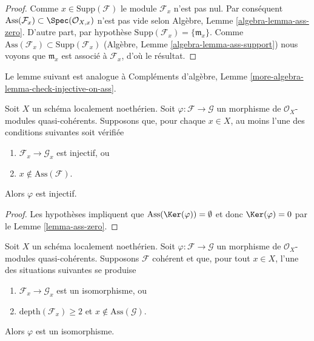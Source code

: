 \begin{proof}
Comme  $x \in \text{Supp}(\mathcal{F})$  le module  $\mathcal{F}_x$  n’est pas nul. Par conséquent
 $\text{Ass}(\mathcal{F}_x) \subset \Spec(\mathcal{O}_{X, x})$  n’est pas vide selon Algèbre, Lemme  \ref{algebra-lemma-ass-zero}. D’autre part, par
hypothèse  $\text{Supp}(\mathcal{F}_x) = \{\mathfrak m_x\}$. Comme  $\text{Ass}(\mathcal{F}_x) \subset \text{Supp}(\mathcal{F}_x)$  (Algèbre, Lemme  \ref{algebra-lemma-ass-support}) nous
voyons que  $\mathfrak m_x$  est associé à  $\mathcal{F}_x$, d'où le résultat.
\end{proof}

\noindent
Le lemme suivant est analogue à Compléments d'algèbre, Lemme  \ref{more-algebra-lemma-check-injective-on-ass}.

\begin{lemma}
\label{lemma-check-injective-on-ass}
Soit $X$ un schéma localement noethérien. Soit
$\varphi : \mathcal{F} \to \mathcal{G}$ un morphisme de
$\mathcal{O}_X$-modules quasi-cohérents. Supposons que, pour
chaque $x \in X$, au moins l'une des conditions suivantes soit vérifiée
\begin{enumerate}
\item $\mathcal{F}_x \to \mathcal{G}_x$  est injectif, ou
\item $x \not \in \text{Ass}(\mathcal{F})$.
\end{enumerate}
Alors  $\varphi$  est injectif.
\end{lemma}

\begin{proof}
Les hypothèses impliquent que  $\text{Ass}(\Ker(\varphi)) = \emptyset$  et donc  $\Ker(\varphi) = 0$  par le Lemme
 \ref{lemma-ass-zero}.
\end{proof}

\begin{lemma}
\label{lemma-check-isomorphism-via-depth-and-ass}
Soit $X$ un schéma localement noethérien. Soit $\varphi : \mathcal{F} \to \mathcal{G}$ un
morphisme de $\mathcal{O}_X$-modules quasi-cohérents. Supposons $\mathcal{F}$ cohérent
et que, pour tout $x \in X$, l'une des situations suivantes se produise
\begin{enumerate}
\item $\mathcal{F}_x \to \mathcal{G}_x$  est un isomorphisme, ou
\item $\text{depth}(\mathcal{F}_x) \geq 2$  et  $x \not \in \text{Ass}(\mathcal{G})$.
\end{enumerate}
Alors  $\varphi$  est un isomorphisme.
\end{lemma}

